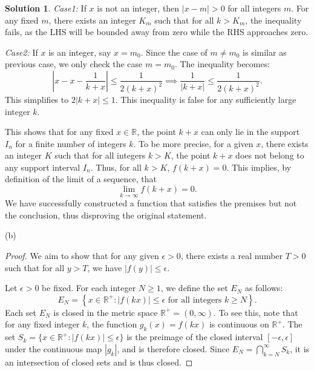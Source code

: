 \documentclass[12pt]{article}
\theoremstyle{definition}
\newtheorem*{solution}{\normalfont\textbf{Solution}}
\begin{document}
\begin{enumerate}[leftmargin=*]
\begin{solution}
            \textit{Case1:} If $x$ is not an integer, then $|x-m| > 0$ for all integers $m$. For any fixed $m$, there exists an integer $K_m$ such that for all $k > K_m$, the inequality fails, as the LHS will be bounded away from zero while the RHS approaches zero.
            
            \textit{Case2:} If $x$ is an integer, say $x=m_0$. Since the case of $m \neq m_0$ is similar as previous case, we only check the case $m=m_0$. The inequality becomes:
                \[ \left| x - x - \frac{1}{k+x} \right| \le \frac{1}{2(k+x)^2} \implies \frac{1}{|k+x|} \le \frac{1}{2(k+x)^2}. \]
                This simplifies to $2|k+x| \le 1$. This inequality is false for any sufficiently large integer $k$.
    
            This shows that for any fixed $x \in \mathbb{R}$, the point $k+x$ can only lie in the support $I_n$ for a finite number of integers $k$. To be more precise, for a given $x$, there exists an integer $K$ such that for all integers $k > K$, the point $k+x$ does not belong to any support interval $I_n$. Thus, for all $k > K$, $f(k+x) = 0$.
            This implies, by definition of the limit of a sequence, that
            \[ \lim_{k \to \infty} f(k+x) = 0. \]
            We have successfully constructed a function that satisfies the premises but not the conclusion, thus disproving the original statement.

        \item[(b)]
            \begin{proof}
                We aim to show that for any given \( \epsilon > 0 \), there exists a real number \( T > 0 \) such that for all \( y > T \), we have \( |f(y)| \leq \epsilon \).

                Let \( \epsilon > 0 \) be fixed. For each integer \( N \geq 1 \), we define the set \( E_N \) as follows:
                \[
                E_N = \left\{ x \in \mathbb{R}^+ : |f(kx)| \leq \epsilon \text{ for all integers } k \geq N \right\}.
                \]
                Each set \( E_N \) is closed in the metric space \( \mathbb{R}^+ = (0, \infty) \). To see this, note that for any fixed integer \( k \), the function \( g_k(x) = f(kx) \) is continuous on \( \mathbb{R}^+ \). The set \( S_k = \{ x \in \mathbb{R}^+ : |f(kx)| \leq \epsilon \} \) is the preimage of the closed interval \( [-\epsilon, \epsilon] \) under the continuous map \( |g_k| \), and is therefore closed. Since \( E_N = \bigcap_{k=N}^{\infty} S_k \), it is an intersection of closed sets and is thus closed.


\end{proof}
\end{solution}
\end{enumerate}
\end{document}
